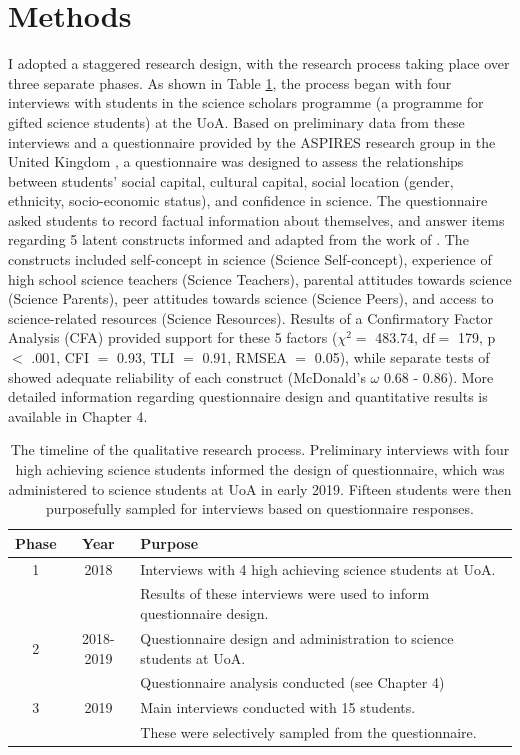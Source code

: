 \section{Methods}
I adopted a staggered research design, with the research process taking place over three separate phases. As shown in Table \ref{tab:Phases}, the process began with four interviews with students in the science scholars programme (a programme for gifted science students) at the UoA. Based on preliminary data from these interviews and a questionnaire provided by the ASPIRES research group in the United Kingdom \citep{dewitt2011high}, a questionnaire was designed to assess the relationships between students' social capital, cultural capital, social location (gender, ethnicity, socio-economic status), and confidence in science. The questionnaire asked students to record factual information about themselves, and answer items regarding 5 latent constructs informed and adapted from the work of \cite{dewitt2011high}. The constructs included self-concept in science (Science Self-concept), experience of high school science teachers (Science Teachers), parental attitudes towards science (Science Parents), peer attitudes towards science (Science Peers), and access to science-related resources (Science Resources). Results of a Confirmatory Factor Analysis (CFA) provided support for these 5 factors ($\chi^{2} =$ 483.74, $\mathrm{df} =$ 179, p $<$ .001, CFI  $=$ 0.93, TLI  $=$ 0.91, RMSEA $=$ 0.05), while separate tests of showed adequate reliability of each construct (McDonald's $\omega$ 0.68 - 0.86). More detailed information regarding questionnaire design and quantitative results is available in Chapter 4. 
\begin{table}[ht]
\begin{tabular}{c|c|l}
                      
Phase  & Year & Purpose    \\ \hline
1   & 2018  & Interviews with 4 high achieving science students at UoA.     \\
& & Results of these interviews were used to inform questionnaire design. \\ \hline
2  & 2018-2019 & Questionnaire design and administration to science students at UoA.  \\
& & Questionnaire analysis conducted (see Chapter 4)\\ \hline
3 & 2019 & Main interviews conducted with 15 students. \\
& & These were selectively sampled from the questionnaire. \\ \hline
\end{tabular}
\caption{\label{tab:Phases} The timeline of the qualitative research process. Preliminary interviews with four high achieving science students informed the design of questionnaire, which was administered to science students at UoA in early 2019. Fifteen students were then purposefully sampled for interviews based on questionnaire responses.}
\end{table}

